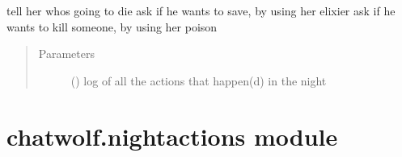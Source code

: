 \documentclass[letterpaper,10pt,english]{sphinxmanual}
\begin{document}
\begin{fulllineitems}
\begin{fulllineitems}
tell her whos going to die
ask if he wants to save, by using her elixier
ask if he wants to kill someone, by using her poison
\begin{quote}\begin{description}
\item[{Parameters}] \leavevmode
{} ({\hyperref[\detokenize{chatwolf:chatwolf.nightactions.Nightactions}]{}}) \textendash{} log of all the actions that happen(d) in the night

\end{description}\end{quote}

\end{fulllineitems}


\end{fulllineitems}



\section{chatwolf.nightactions module}
\label{\detokenize{chatwolf:module-chatwolf.nightactions}}\label{\detokenize{chatwolf:chatwolf-nightactions-module}}
\end{document}
